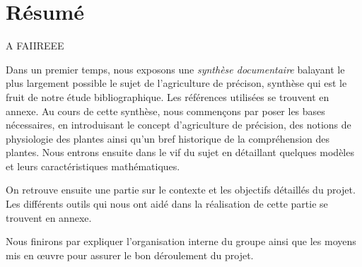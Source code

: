 \section{Résumé}

A FAIIREEE

Dans un premier temps, nous exposons une \emph{synthèse documentaire}
balayant le plus largement possible le sujet de l'agriculture de précison,
synthèse qui est le fruit de notre étude bibliographique.
Les références utilisées se trouvent en annexe.
Au cours de cette synthèse, nous commençons par poser les bases
nécessaires, en introduisant le concept
d'agriculture de précision, des notions de physiologie des plantes
ainsi qu'un bref historique de la compréhension des plantes.
Nous entrons ensuite dans le vif du sujet en détaillant quelques modèles
et leurs caractéristiques mathématiques.

On retrouve ensuite une partie sur le contexte
et les objectifs détaillés du projet.
Les différents outils qui nous ont aidé dans la réalisation de
cette partie se trouvent en annexe.

Nous finirons par expliquer l'organisation interne du groupe
ainsi que les moyens mis en \oe{}uvre pour assurer
le bon déroulement du projet.